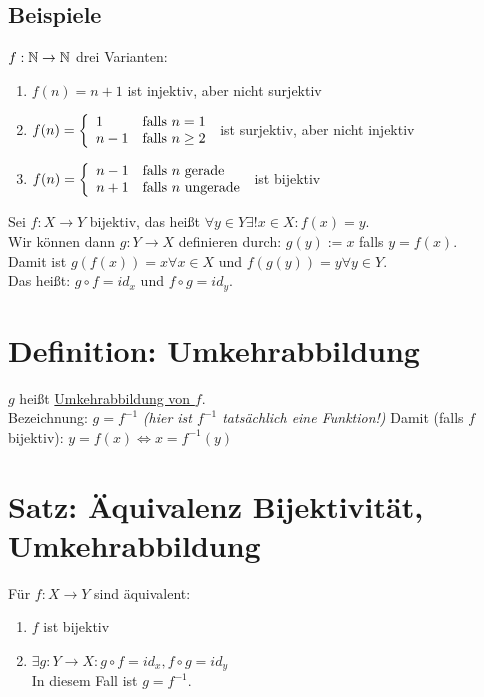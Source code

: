 \newpage

\subsection*{Beispiele}
$f: \mathbb{N} \to \mathbb{N}$ drei Varianten:
\begin{enumerate}[label=(\roman*)]
\item $f(n)=n+1$ ist injektiv, aber nicht surjektiv
\item $f(n)=\left\{ \begin{array}{l l}
1 & \text{falls } n=1 \\
n-1 & \text{falls } n \ge 2
\end{array} \right.$ ist surjektiv, aber nicht injektiv
\item $f(n)=\left\{ \begin{array}{l l}
n-1 & \text{falls } n \text{ gerade} \\
n+1 & \text{falls } n \text{ ungerade}
\end{array} \right.$ ist bijektiv
\end{enumerate}
Sei $f:X \to Y$ bijektiv, das heißt $\forall y \in Y \exists! x \in X : f(x)=y$.\\
Wir können dann $g: Y \to X$ definieren durch: $g(y) := x$ falls $y=f(x)$.\\
Damit ist $g(f(x))=x \forall x \in X$ und $f(g(y)) = y \forall y \in Y$.\\
Das heißt: $g \circ f = id_x$ und $f \circ g = id_y$.

\section{Definition: Umkehrabbildung}\label{4.6}
$g$ heißt \underline{Umkehrabbildung von $f$}.\\
Bezeichnung: $g=f^{-1}$ \emph{(hier ist $f^{-1}$ tatsächlich eine Funktion!)}\nl
Damit (falls $f$ bijektiv): $y=f(x) \Leftrightarrow x=f^{-1}(y)$

\section{Satz: Äquivalenz Bijektivität, Umkehrabbildung}\label{4.7}
Für $f: X \to Y$ sind äquivalent:
\begin{enumerate}[label=(\roman*)]
\item $f$ ist bijektiv
\item $\exists g: Y \to X: g \circ f = id_x, f \circ g = id_y$\\
In diesem Fall ist $g=f^{-1}$.
\end{enumerate}

